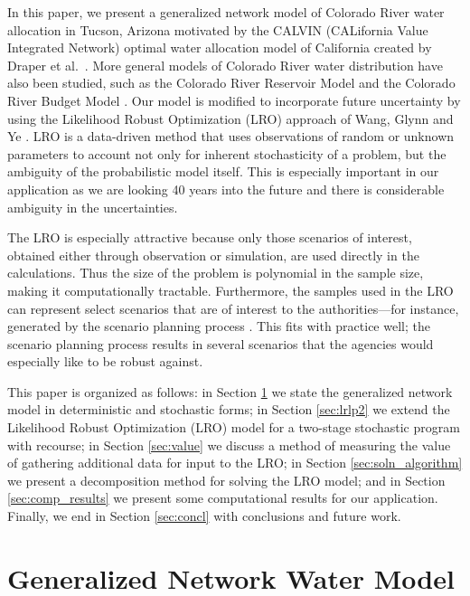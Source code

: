 \documentclass[11pt]{article}
\begin{document}
In this paper, we present a generalized network model of Colorado River water allocation in Tucson, Arizona motivated by the CALVIN (CALifornia Value Integrated Network) optimal water allocation model of California created by Draper et al.\ \cite{draper_etal_03}.
More general models of Colorado River water distribution have also been studied, such as the Colorado River Reservoir Model \cite{christensen2004effects} and the Colorado River Budget Model \cite{barnett2009sustainable}.
Our model is modified to incorporate future uncertainty by using the Likelihood Robust Optimization (LRO) approach of Wang, Glynn and Ye \cite{wang2010likelihood}.
LRO is a data-driven method that uses observations of random or unknown parameters to account not only for inherent stochasticity of a problem, but the ambiguity of the probabilistic model itself.
This is especially important in our application as we are looking 40 years into the future and there is considerable ambiguity in the uncertainties.

The LRO is especially attractive because only those scenarios of interest, obtained either through observation or simulation, are used directly in the calculations.
Thus the size of the problem is polynomial in the sample size, making it computationally tractable.
Furthermore, the samples used in the LRO can represent select scenarios that are of interest to the authorities---for instance, generated by the scenario planning process \cite{cityofTucsonWaterPlan,usbr_11}.
This fits with practice well; the scenario planning process results in several scenarios that the agencies would especially like to be robust against.

This paper is organized as follows: in Section \ref{sec:network_model} we state the generalized network model in deterministic and stochastic forms; in Section \ref{sec:lrlp2} we extend the Likelihood Robust Optimization (LRO) model for a two-stage stochastic program with recourse; in Section \ref{sec:value} we discuss a method of measuring the value of gathering additional data for input to the LRO; in Section \ref{sec:soln_algorithm} we present a decomposition method for solving the LRO model; and in Section \ref{sec:comp_results} we present some computational results for our application. Finally, we end in Section \ref{sec:concl} with conclusions and future work.


\section{Generalized Network Water Model} 
\label{sec:network_model}
\end{document}
